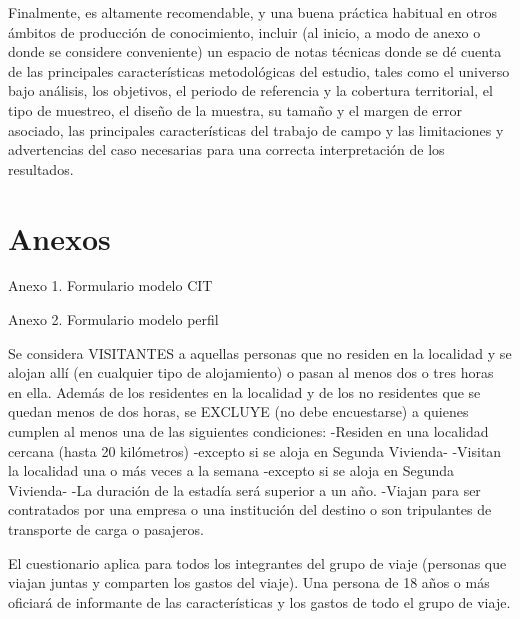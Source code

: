 \documentclass[
]{book}
\begin{document}
Finalmente, es altamente recomendable, y una buena práctica habitual en otros ámbitos de producción de conocimiento, incluir (al inicio, a modo de anexo o donde se considere conveniente) un espacio de notas técnicas donde se dé cuenta de las principales características metodológicas del estudio, tales como el universo bajo análisis, los objetivos, el periodo de referencia y la cobertura territorial, el tipo de muestreo, el diseño de la muestra, su tamaño y el margen de error asociado, las principales características del trabajo de campo y las limitaciones y advertencias del caso necesarias para una correcta interpretación de los resultados.\\

\hypertarget{anexos}{%
\chapter*{\texorpdfstring{\textbf{Anexos}}{Anexos}}\label{anexos}}

Anexo 1. Formulario modelo CIT

Anexo 2. Formulario modelo perfil

Se considera VISITANTES a aquellas personas que no residen en la localidad y se alojan allí (en cualquier tipo de alojamiento) o pasan al menos dos o tres horas en ella. Además de los residentes en la localidad y de los no residentes que se quedan menos de dos horas, se EXCLUYE (no debe encuestarse) a quienes cumplen al menos una de las siguientes condiciones:
-Residen en una localidad cercana (hasta 20 kilómetros) -excepto si se aloja en Segunda Vivienda-
-Visitan la localidad una o más veces a la semana -excepto si se aloja en Segunda Vivienda-
-La duración de la estadía será superior a un año.
-Viajan para ser contratados por una empresa o una institución del destino o son tripulantes de transporte de carga o pasajeros.

El cuestionario aplica para todos los integrantes del grupo de viaje (personas que viajan juntas y comparten los gastos del viaje).
Una persona de 18 años o más oficiará de informante de las características y los gastos de todo el grupo de viaje.
\end{document}
